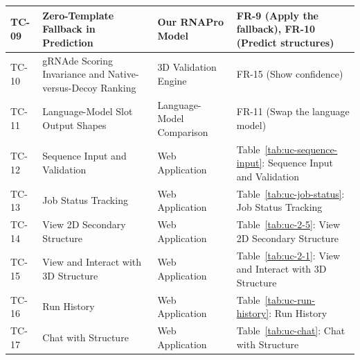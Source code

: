 \documentclass{FastFyp}
\begin{document}
{\begin{longtable}{|p{1.7cm}|p{4.4cm}|p{4.2cm}|p{3.6cm}|}
TC-09 & Zero-Template Fallback in Prediction & Our RNAPro Model & FR-9 (Apply the fallback), FR-10 (Predict structures) \\ \hline
TC-10 & gRNAde Scoring Invariance and Native-versus-Decoy Ranking & 3D Validation Engine & FR-15 (Show confidence) \\ \hline
TC-11 & Language-Model Slot Output Shapes & Language-Model Comparison & FR-11 (Swap the language model) \\ \hline
TC-12 & Sequence Input and Validation & Web Application & Table~\ref{tab:uc-sequence-input}: Sequence Input and Validation \\ \hline
TC-13 & Job Status Tracking & Web Application & Table~\ref{tab:uc-job-status}: Job Status Tracking \\ \hline
TC-14 & View 2D Secondary Structure & Web Application & Table~\ref{tab:uc-2-5}: View 2D Secondary Structure \\ \hline
TC-15 & View and Interact with 3D Structure & Web Application & Table~\ref{tab:uc-2-1}: View and Interact with 3D Structure \\ \hline
TC-16 & Run History & Web Application & Table~\ref{tab:uc-run-history}: Run History \\ \hline
TC-17 & Chat with Structure & Web Application & Table~\ref{tab:uc-chat}: Chat with Structure \\ \hline
\end{longtable}
}
\end{document}
